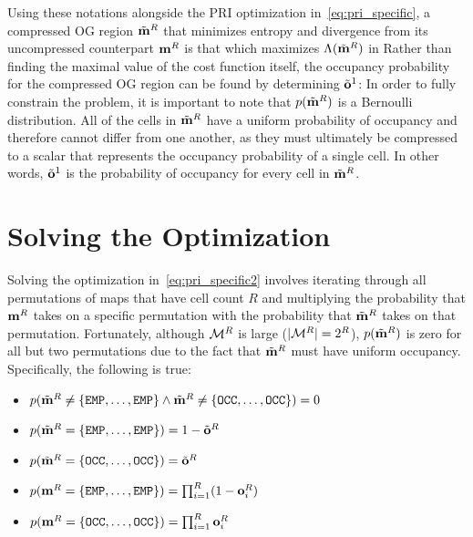 Using these notations alongside the PRI optimization in~\eqref{eq:pri_specific}, a
compressed OG region $\tilde{\mathbf{m}}^{R}$ that minimizes entropy and divergence from
its uncompressed counterpart $\mathbf{m}^{R}$ is that which maximizes $\Lambda(\tilde{\mathbf{m}}^{R})$ in
%
%
Rather than finding the maximal value of the cost function itself, the
occupancy probability for the compressed OG region can be found by determining
$\tilde{\mathbf{o}}^{1}$:
%
%
In order to fully constrain the problem, it is important to note that
$p(\tilde{\mathbf{m}}^{R})$ is a Bernoulli distribution. All of the cells in
$\tilde{\mathbf{m}}^{R}$ have a uniform probability of occupancy and therefore
cannot differ from one another, as they must ultimately be compressed to a
scalar that represents the occupancy probability of a single cell. In other
words, $\tilde{\mathbf{o}}^{1}$ is the probability of occupancy for every cell in
$\tilde{\mathbf{m}}^{R}$.

\section{Solving the Optimization}
\label{sec:solving_pri}

Solving the optimization in~\eqref{eq:pri_specific2} involves iterating through all
permutations of maps that have cell count $R$ and multiplying the probability that
$\mathbf{m}^{R}$ takes on a specific permutation with the probability that
$\tilde{\mathbf{m}}^{R}$ takes on that permutation. Fortunately, although $\mathcal{M}^{R}$ is large
($\vert \mathcal{M}^{R} \vert = 2^{R}$), $p(\tilde{\mathbf{m}}^{R})$ is zero for
all but two permutations due to the fact that $\tilde{\mathbf{m}}^{R}$ must have
uniform occupancy. Specifically, the following is true:

\begin{itemize}
  \item
    $p(
    \tilde{\mathbf{m}}^{R}
    \ne
    \{\texttt{EMP}, \dots, \texttt{EMP}\}
    \wedge
    \tilde{\mathbf{m}}^{R}
    \ne
    \{\texttt{OCC}, \dots, \texttt{OCC}\}
    ) = 0$
  \item
    $p(\tilde{\mathbf{m}}^{R}
    =
    \{\texttt{EMP}, \dots, \texttt{EMP}\}) = 1 - \tilde{\mathbf{o}}^{R}$
  \item
    $p(\tilde{\mathbf{m}}^{R}
    =
    \{\texttt{OCC}, \dots, \texttt{OCC}\}) = \tilde{\mathbf{o}}^{R}$
  \item
    $p(\mathbf{m}^{R} = \{\texttt{EMP},\dots,\texttt{EMP}\})
    =
    \prod_{i=1}^{R}(1-\mathbf{o}^{R}_{i})$
  \item
    $p(\mathbf{m}^{R} = \{\texttt{OCC},\dots,\texttt{OCC}\})
    =
    \prod_{i=1}^{R}\mathbf{o}^{R}_{i}$
\end{itemize}


